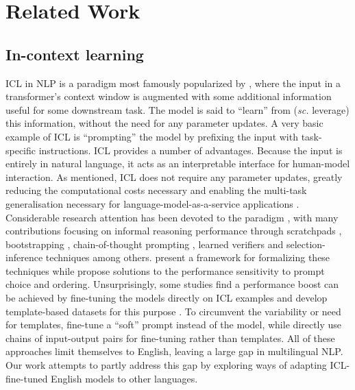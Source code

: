 \documentclass[11pt]{article}
\begin{document}
\section{Related Work}

\subsection{In-context learning}

ICL in NLP is a paradigm most famously popularized by \citet{brown_language_2020}, where the input
in a transformer's context window is augmented with some additional information useful for some
downstream task. The model is said to ``learn''  from (\textit{sc.} leverage) this information,
without the need for any parameter updates. A very basic example of ICL is ``prompting'' the model
by prefixing the input with task-specific instructions. ICL provides a number of advantages. Because
the input is entirely in natural language, it acts as an interpretable interface for human-model
interaction. As mentioned, ICL does not require any parameter updates, greatly reducing the
computational costs necessary and enabling the multi-task generalisation necessary for
language-model-as-a-service applications \citep{sun_black-box_2022}. Considerable research attention
has been devoted to the paradigm \citep{liu_what_2022,lu_fantastically_2022,wu_self-adaptive_2022},
with many contributions focusing on informal reasoning performance through scratchpads
\citep{nye_show_2021}, bootstrapping \citep{zelikman_star_2022}, chain-of-thought prompting
\citep{wei_chain--thought_2022,wang_self-consistency_2023}, learned verifiers
\citep{cobbe_training_2021} and selection-inference \citep{creswell_selection-inference_2023}
techniques among others. \citet{dohan_language_2022} present a framework for formalizing these
techniques while \citet{zhao_calibrate_2021} propose solutions to the performance sensitivity to
prompt choice and ordering. Unsurprisingly, some studies find a performance boost can be achieved by
fine-tuning the models directly on ICL examples \citep{sanh_multitask_2022,wang_benchmarking_2022}
and develop template-based datasets for this purpose
\citep{bach_promptsource_2022,mishra_cross-task_2022}. To circumvent the variability or need for
templates, \citet{lester_power_2021} fine-tune a ``soft'' prompt instead of the model, while
\citet{min_metaicl_2022} directly use chains of input-output pairs for fine-tuning rather than
templates. All of these approaches limit themselves to English, leaving a large gap in multilingual
NLP. Our work attempts to partly address this gap by exploring ways of adapting ICL-fine-tuned
English models to other languages.
\end{document}
